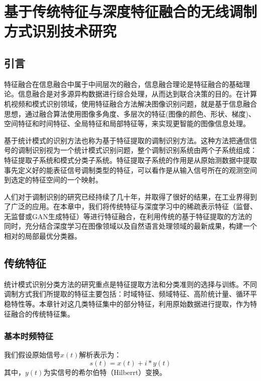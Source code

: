 \chapter{基于传统特征与深度特征融合的无线调制方式识别技术研究}
\section{引言}
特征融合在信息融合中属于中间层次的融合，信息融合理论是特征融合的基础理论。信息融合是对多源异构数据进行综合处理，从而达到联合决策的目的。在计算机视频和模式识别领域，使用特征融合方法解决图像识别问题，就是基于信息融合思想，通过融合算法使用图像多角度、多层次的特征(图像的颜色、形状、梯度)、空间特征和时间特征、全局特征和局部特征等，来实现更智能的图像信息处理。\par

基于统计模式的识别方法也称为基于特征提取的调制识别方法。这种方法把通信信号的调制识别视为一个统计模式识别问题，整个调制识别系统由两个子系统组成：特征提取子系统和模式分类子系统。特征提取子系统的作用是从原始测数据中提取事先定义好的能表征信号调制类型的特征，可以看作是从输入信号所在的观测空间到选定的特征空间的一个映射。\par

人们对于调制识别的研究已经持续了几十年，并取得了很好的结果，在工业界得到了广泛的应用。在本章中，我们将传统特征与深度学习中的稀疏表示特征（监督、无监督或GAN生成特征）等进行特征融合，在利用传统的基于特征提取的方法的同时，充分结合深度学习在图像领域以及自然语言处理领域的最新成果，构建一个相对的局部最优分类器。\par

\section{传统特征}

统计模式识别分类方法的研究重点是特征提取方法和分类准则的选择与训练。不同调制方式我们所提取的特征主要包括：时域特征、频域特征、高阶统计量、循环平稳特性等。本章针对这几类特征集中的部分特征，利用原始数据进行提取，作为特征融合的传统特征集。\par

\subsection{基本时频特征}

我们假设原始信号$x(t)$解析表示为：
\begin{equation}
s(t)=x(t)+i*y(t)
\end{equation}
其中，$y(t)$为实信号的希尔伯特（Hilberrt）变换。\par

